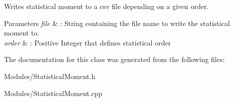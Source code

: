 Writes statistical moment to a csv file depending on a given order. 


\begin{DoxyParams}{Parameters}
{\em file} & \+: String containing the file name to write the statistical moment to. \\
\hline
{\em order} & \+: Positive Integer that defines statistical order \\
\hline
\end{DoxyParams}


The documentation for this class was generated from the following files\+:\begin{DoxyCompactItemize}
\item 
Modules/Statistical\+Moment.\+h\item 
Modules/Statistical\+Moment.\+cpp\end{DoxyCompactItemize}
